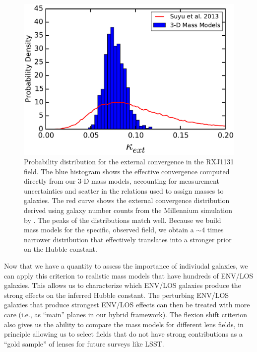 \documentclass{emulateapj}
\begin{document}
\begin{figure}[t]
\begin{center}
\includegraphics[width=\columnwidth]{suyu_kappa.pdf}
\caption{\label{fig:kappa} Probability distribution for the external convergence in the RXJ1131 field. The blue histogram shows the effective convergence computed directly from our 3-D mass models, accounting for measurement uncertainties and scatter in the relations used to assign masses to galaxies. The red curve shows the external convergence distribution derived using galaxy number counts from the Millennium simulation by \citet{Suyu13}. The peaks of the distributions match well. Because we build mass models for the specific, observed field, we obtain a $\sim 4$ times narrower distribution that effectively translates into a stronger prior on the Hubble constant.%
}
\end{center}
\end{figure}


Now that we have a quantity to assess the importance of indiviudal galaxies, we can apply this criterion to realistic mass models that have hundreds of ENV/LOS galaxies. This allows us to characterize which ENV/LOS galaxies produce the strong effects on the inferred Hubble constant. The perturbing ENV/LOS galaxies that produce strongest ENV/LOS effects can then be treated with more care (i.e., as ``main'' planes in our hybrid framework). The flexion shift criterion also gives us the ability to compare the mass models for different lens fields, in principle allowing us to select fields that do not have strong contributions as a ``gold sample'' of lenses for future surveys like LSST. 
\end{document}

